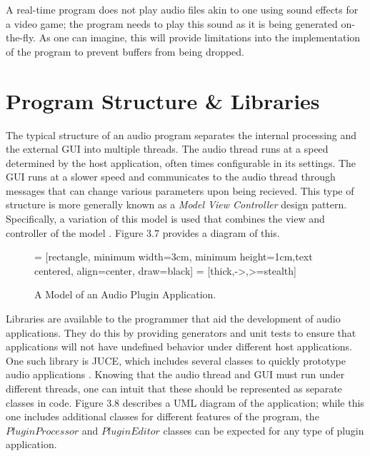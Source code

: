 A real-time program does not play audio files akin to one using sound effects for a video game; the program needs to play this sound as it is being generated on-the-fly. As one can imagine, this will provide limitations into the implementation of the program to prevent buffers from being dropped.


\section{Program Structure \& Libraries}
The typical structure of an audio program separates the internal processing and the external GUI into multiple threads. The audio thread runs at a speed determined by the host application, often times configurable in its settings. The GUI runs at a slower speed and communicates to the audio thread through messages that can change various parameters upon being recieved. This type of structure is more generally known as a \textit{Model View Controller} design pattern. Specifically, a variation of this model is used that combines the view and controller of the model \cite{Bucanek2009}. Figure 3.7 provides a diagram of this.

\begin{figure}[h] %
	 = [rectangle, minimum width=3cm, minimum height=1cm,text centered, align=center, draw=black]
	 = [thick,->,>=stealth]
	\begin{center}
		\caption{A Model of an Audio Plugin Application.}
	\end{center}
\end{figure}

Libraries are available to the programmer that aid the development of audio applications. They do this by providing generators and unit tests to ensure that applications will not have undefined behavior under different host applications. One such library is JUCE, which includes several classes to quickly prototype audio applications \cite{JUCE}. Knowing that the audio thread and GUI must run under different threads, one can intuit that these should be represented as separate classes in code. Figure 3.8 describes a UML diagram of the application; while this one includes additional classes for different features of the program, the $PluginProcessor$ and $PluginEditor$ classes can be expected for any type of plugin application.

